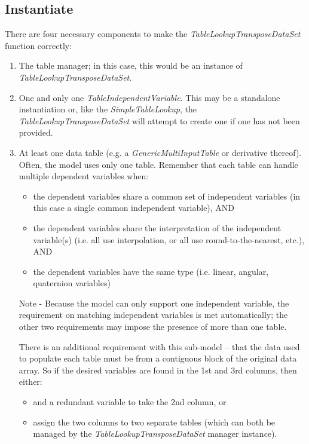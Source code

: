 \documentclass[11pt,fleqn]{report}
\begin{document}
\subsection{Instantiate}
There are four necessary components to make the
\textit{TableLookupTransposeDataSet} function correctly:
\begin{enumerate}
 \item The table manager; in this case, this would be an instance of
       \textit{TableLookupTransposeDataSet}.
 \item One and only one \textit{TableIndependentVariable}. This may be a
       standalone instantiation or, like the \textit{SimpleTableLookup}, the
       \textit{TableLookupTransposeDataSet} will attempt to create one if one
       has not been provided.
 \item At least one data table (e.g. a \textit{GenericMultiInputTable} or
       derivative thereof).
       Often, the model uses only one table.  Remember that each table can
       handle multiple dependent variables when:
       \begin{itemize}
        \item the dependent variables share a common set of independent
        variables (in this case a single common independent variable), AND
        \item the dependent variables share the interpretation of the
        independent variable(s)
        (i.e. all use interpolation, or all use round-to-the-nearest, etc.),
        AND
        \item the dependent variables have the same type (i.e. linear,
        angular, quaternion variables)
       \end{itemize}
       Note - Because the model can only support
       one independent variable, the requirement on matching independent
       variables is met automatically; the other two requirements may
       impose the presence of more than one table.

       There is an additional requirement
       with this sub-model -- that the data used to populate each table must be
       from a contiguous block of the original data array.  So if the desired
       variables are found in the 1st and 3rd columns, then either:
       \begin{itemize}
        \item and a redundant variable to take the 2nd column, or
        \item assign the two columns to two separate tables (which can both be
        managed by the \textit{TableLookupTransposeDataSet} manager instance).
       \end{itemize}


\end{enumerate}
\end{document}
